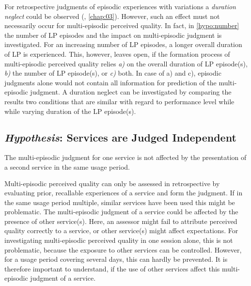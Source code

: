 {For retrospective judgments of episodic experiences with variations a \emph{duration neglect} could be observed (\cf, \autoref{chap:03}).
However, such an effect must not necessarily occur for multi-episodic perceived quality.
In fact, in \autoref{hypo:number} the number of \ac{LP} episodes and the impact on multi-episodic judgment is investigated.
For an increasing number of \ac{LP} episodes, a longer overall duration of \ac{LP} is experienced.
This, however, leaves open, if the formation process of multi-episodic perceived quality relies \emph{a)} on the overall duration of \ac{LP} episode(s), \emph{b)} the number of \ac{LP} episode(s), or \emph{c)} both.
In case of a) and c), episodic judgments alone would not contain all information for prediction of the multi-episodic judgment.
A duration neglect can be investigated by comparing the results two conditions that are similar with regard to performance level while while varying duration of the \ac{LP} episode(s).

\subsection{\emph{Hypothesis}: Services are Judged Independent}
\begin{hypothesis}\label{hypo:independent}
The multi-episodic judgment for one service is not affected by the presentation of a second service in the same usage period.
\end{hypothesis}

Multi-episodic perceived quality can only be assessed in retrospective by evaluating prior, recallable experiences of a service and form the judgment.
If in the same usage period multiple, similar services have been used this might be problematic.
The multi-episodic judgment of a service could be affected by the presence of other service(s).
Here, an assessor might fail to attribute perceived quality correctly to a service, or other service(s) might affect expectations.
For investigating multi-episodic perceived quality in one session alone, this is not problematic, because the exposure to other services can be controlled.
However, for a usage period covering several days, this can hardly be prevented.
It is therefore important to understand, if the use of other services affect this multi-episodic judgment of a service.

}
